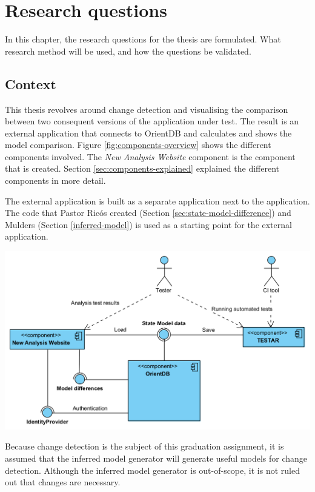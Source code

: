 \chapter{Research questions} \label{chapter:research}
In this chapter, the research questions for the thesis are formulated. What research method will be used, and how the questions be validated.

\section{Context}
This thesis revolves around change detection and visualising the comparison between two consequent versions of the application under test. The result is an external application that connects to OrientDB and calculates and shows the model comparison. Figure \ref{fig:components-overview} shows the different components involved. The \textit{New Analysis Website} component is the component that is created. Section \ref{sec:components-explained} explained the different components in more detail.

The external application is built as a separate application next to the \testar application. The code that Pastor Ricós created (Section \ref{sec:state-model-difference}) and Mulders (Section \ref{inferred-model}) is used as a starting point for the external application. 

\begingroup
\captionsetup{type=figure}
\includegraphics[scale=0.4]{images/3-UML-high-level.png}
\label{fig:components-overview}
\endgroup

Because change detection is the subject of this graduation assignment, it is assumed that the inferred model generator will generate useful models for change detection. Although the inferred model generator is out-of-scope, it is not ruled out that changes are necessary.

